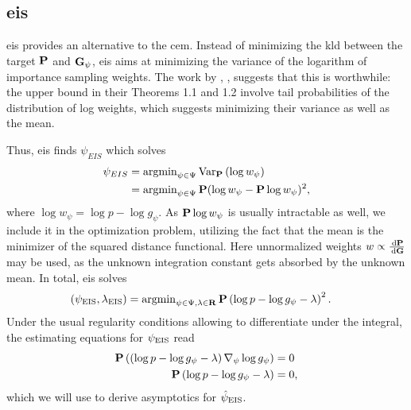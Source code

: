 \subsection{\texorpdfstring{\Acrfull{eis}}{Efficient importance sampling}}
\label{subsec:eis}
\gls{eis}\citep{Richard2007Efficient} provides an alternative to the \gls{cem}. Instead of minimizing the \gls{kld} between the target $\P$ and $\G_{\psi}$, \gls{eis} aims at minimizing the variance of the logarithm of importance sampling weights. 
The work by \citep{Chatterjee2018Sample} \citep{Chatterjee2018Sample}, , suggests that this is worthwhile: the upper bound in their Theorems 1.1 and 1.2 involve tail probabilities of the distribution of log weights, which suggests minimizing their variance as well as the mean.

Thus, \gls{eis} finds $\psi_{EIS}$ which solves 
\begin{align*}
\psi_{EIS} &= \argmin_{\psi \in\Psi} \text{Var}_{\P} \left( \log w_{\psi} \right) \\
    &= \argmin_{\psi \in \Psi} \P (\log w_{\psi} - \P \log w_{\psi})^{2},
\end{align*}
where $\log w_{\psi} = \log p - \log g_{\psi}$.
As $\P \log w_{\psi}$ is usually intractable as well, we include it in the optimization problem, utilizing the fact that the mean is the minimizer of the squared distance functional.
Here unnormalized weights $w \propto \frac{\d\P}{\d\G}$ may be used, as the unknown integration constant gets absorbed by the unknown mean. In total, \gls{eis} solves
\begin{align*}
\left(\psi_{\text{EIS}}, \lambda_{\text{EIS}}\right) &= \argmin_{\psi \in\Psi, \lambda \in \mathbf R} \P \left( \log p - \log g_{\psi} - \lambda \right)^{2}.
\end{align*}
Under the usual regularity conditions allowing to differentiate under the integral, the estimating equations for $\peis$ read
\begin{align}
    \begin{split}
    \label{eq:eis-optimal}
    \P \left(\left( \log p - \log g_{\psi} - \lambda \right) \nabla_{\psi}\log g_{\psi}\right)&=0\\
    \P \left( \log p - \log g_{\psi} - \lambda \right)&=0,
    \end{split}
\end{align}
which we will use to derive asymptotics for $\hpeis$. 

